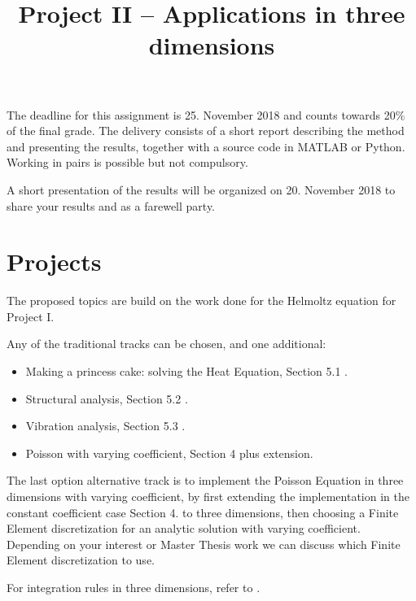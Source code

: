 \documentclass[assignment]{tmanotes}
\title{Project II -- Applications in three dimensions}
\date{}
\begin{document}
\maketitle

The deadline for this assignment is 25. November 2018 and counts towards 20\% of the final grade.
The delivery consists of a short report describing the method and presenting the results, together with a source code in MATLAB or Python.
Working in pairs is possible but not compulsory.

\medskip
A short presentation of the results will be organized on 20. November 2018 to share your results and as a farewell party.

\section{Projects}

The proposed topics are build on the work done for the Helmoltz equation for Project I.

\medskip
Any of the traditional tracks can be chosen, and one additional:
\begin{itemize}
\item Making a princess cake: solving the Heat Equation, Section 5.1 \cite{P2}.
\item Structural analysis, Section 5.2 \cite{P2}.
\item Vibration analysis, Section 5.3 \cite{P2}.
\item Poisson with varying coefficient, Section 4 \cite{P1} plus extension.
\end{itemize}

\medskip
The last option alternative track is to implement the Poisson Equation in three dimensions with varying coefficient, by first extending the implementation in the constant coefficient case Section 4. \cite{P1} to three dimensions, then choosing a Finite Element discretization for an analytic solution with varying coefficient.
Depending on your interest or Master Thesis work we can discuss which Finite Element discretization to use.

\medskip
For integration rules in three dimensions, refer to \cite{P1}.


\end{document}
